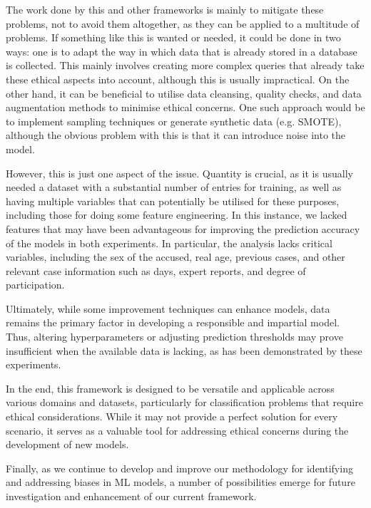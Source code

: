 \documentclass[fleqn,10pt]{wlscirep}
\begin{document}
The work done by this and other frameworks is mainly to mitigate these problems, not to avoid them altogether, as they can be applied to a multitude of problems. If something like this is wanted or needed, it could be done in two ways: one is to adapt the way in which data that is already stored in a database is collected. This mainly involves creating more complex queries that already take these ethical aspects into account, although this is usually impractical. On the other hand, it can be beneficial to utilise data cleansing, quality checks, and data augmentation methods to minimise ethical concerns. One such approach would be to implement sampling techniques or generate synthetic data (e.g. SMOTE), although the obvious problem with this is that it can introduce noise into the model.

However, this is just one aspect of the issue. Quantity is crucial, as it is usually needed a dataset with a substantial number of entries for training, as well as having multiple variables that can potentially be utilised for these purposes, including those for doing some feature engineering. In this instance, we lacked features that may have been advantageous for improving the prediction accuracy of the models in both experiments. In particular, the analysis lacks critical variables, including the sex of the accused, real age, previous cases, and other relevant case information such as days, expert reports, and degree of participation.

Ultimately, while some improvement techniques can enhance models, data remains the primary factor in developing a responsible and impartial model. Thus, altering hyperparameters or adjusting prediction thresholds may prove insufficient when the available data is lacking, as has been demonstrated by these experiments.

In the end, this framework is designed to be versatile and applicable across various domains and datasets, particularly for classification problems that require ethical considerations. While it may not provide a perfect solution for every scenario, it serves as a valuable tool for addressing ethical concerns during the development of new models.

Finally, as we continue to develop and improve our methodology for identifying and addressing biases in ML models, a number of possibilities emerge for future investigation and enhancement of our current framework.
\end{document}
